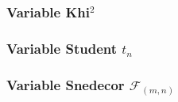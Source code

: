 \subsubsection{Variable Khi$^2$}
\subsubsection{Variable Student $t_n$}
\subsubsection{Variable Snedecor $\mathcal{F}_{(m,n)}$}


